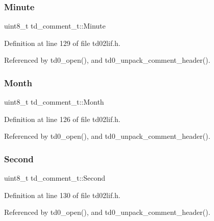 \subsubsection{\texorpdfstring{Minute}{Minute}}
{\footnotesize\ttfamily uint8\+\_\+t td\+\_\+comment\+\_\+t\+::\+Minute}



Definition at line 129 of file td02lif.\+h.



Referenced by td0\+\_\+open(), and td0\+\_\+unpack\+\_\+comment\+\_\+header().

\mbox{\label{structtd__comment__t_ac926fbfad0e3544bb45bb05b7cd66c49}} 
\subsubsection{\texorpdfstring{Month}{Month}}
{\footnotesize\ttfamily uint8\+\_\+t td\+\_\+comment\+\_\+t\+::\+Month}



Definition at line 126 of file td02lif.\+h.



Referenced by td0\+\_\+open(), and td0\+\_\+unpack\+\_\+comment\+\_\+header().

\mbox{\label{structtd__comment__t_ae89673be13e6cad1c83bd51034689248}} 
\subsubsection{\texorpdfstring{Second}{Second}}
{\footnotesize\ttfamily uint8\+\_\+t td\+\_\+comment\+\_\+t\+::\+Second}



Definition at line 130 of file td02lif.\+h.



Referenced by td0\+\_\+open(), and td0\+\_\+unpack\+\_\+comment\+\_\+header().

\mbox{\label{structtd__comment__t_aca61f38ae62a6de2ff0eab7da2c25e11}} 
